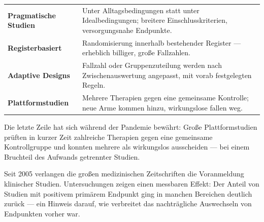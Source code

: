 \begin{forschung}
\begin{center}
{\small
\renewcommand{\arraystretch}{1.45}
\begin{tabular}{@{}P{2.8cm}P{5.4cm}@{}}
\toprule
\textbf{Pragmatische Studien} & Unter Alltagsbedingungen statt unter Idealbedingungen; breitere Einschlusskriterien, versorgungsnahe Endpunkte.\\
\textbf{Registerbasiert} & Randomisierung innerhalb bestehender Register --- erheblich billiger, große Fallzahlen.\\
\textbf{Adaptive Designs} & Fallzahl oder Gruppenzuteilung werden nach Zwischenauswertung angepasst, mit vorab festgelegten Regeln.\\
\textbf{Plattform\-studien} & Mehrere Therapien gegen eine gemeinsame Kontrolle; neue Arme kommen hinzu, wirkungslose fallen weg.\\
\bottomrule
\end{tabular}}
\end{center}

Die letzte Zeile hat sich während der Pandemie bewährt: Große Plattformstudien prüften in kurzer Zeit zahlreiche Therapien gegen eine gemeinsame Kontrollgruppe und konnten mehrere als wirkungslos ausscheiden --- bei einem Bruchteil des Aufwands getrennter Studien.

\begin{center}
\begin{minipage}{0.88\textwidth}
\end{minipage}
\end{center}

Seit 2005 verlangen die großen medizinischen Zeitschriften die Voranmeldung klinischer Studien. Untersuchungen zeigen einen messbaren Effekt: Der Anteil von Studien mit positivem primärem Endpunkt ging in manchen Bereichen deutlich zurück --- ein Hinweis darauf, wie verbreitet das nachträgliche Auswechseln von Endpunkten vorher war.
\end{forschung}

